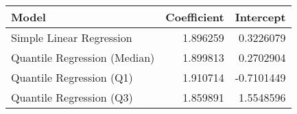 
\begin{tabular}{l|r|r}
\hline
Model & Coefficient & Intercept\\
\hline
Simple Linear Regression & 1.896259 & 0.3226079\\
\hline
Quantile Regression (Median) & 1.899813 & 0.2702904\\
\hline
Quantile Regression (Q1) & 1.910714 & -0.7101449\\
\hline
Quantile Regression (Q3) & 1.859891 & 1.5548596\\
\hline
\end{tabular}
